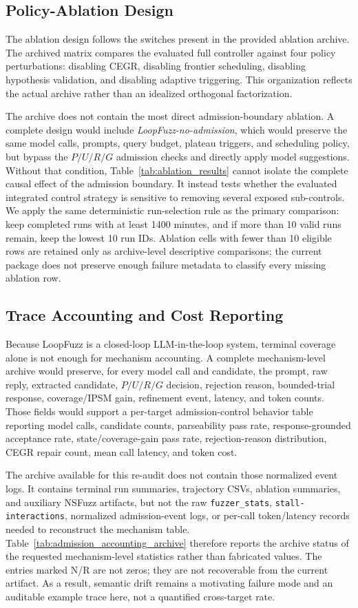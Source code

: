 \documentclass[final,5p,times,number]{elsarticle}
\begin{document}
\subsection{Policy-Ablation Design}
The ablation design follows the switches present in the provided ablation archive. The archived matrix compares the evaluated full controller against four policy perturbations: disabling CEGR, disabling frontier scheduling, disabling hypothesis validation, and disabling adaptive triggering. This organization reflects the actual archive rather than an idealized orthogonal factorization.

The archive does not contain the most direct admission-boundary ablation. A complete design would include \emph{LoopFuzz-no-admission}, which would preserve the same model calls, prompts, query budget, plateau triggers, and scheduling policy, but bypass the $P/U/R/G$ admission checks and directly apply model suggestions. Without that condition, Table~\ref{tab:ablation_results} cannot isolate the complete causal effect of the admission boundary. It instead tests whether the evaluated integrated control strategy is sensitive to removing several exposed sub-controls. We apply the same deterministic run-selection rule as the primary comparison: keep completed runs with at least 1400 minutes, and if more than 10 valid runs remain, keep the lowest 10 run IDs. Ablation cells with fewer than 10 eligible rows are retained only as archive-level descriptive comparisons; the current package does not preserve enough failure metadata to classify every missing ablation row.

\subsection{Trace Accounting and Cost Reporting}
Because LoopFuzz is a closed-loop LLM-in-the-loop system, terminal coverage alone is not enough for mechanism accounting. A complete mechanism-level archive would preserve, for every model call and candidate, the prompt, raw reply, extracted candidate, $P/U/R/G$ decision, rejection reason, bounded-trial response, coverage/IPSM gain, refinement event, latency, and token counts. Those fields would support a per-target admission-control behavior table reporting model calls, candidate counts, parseability pass rate, response-grounded acceptance rate, state/coverage-gain pass rate, rejection-reason distribution, CEGR repair count, mean call latency, and token cost.

The archive available for this re-audit does not contain those normalized event logs. It contains terminal run summaries, trajectory CSVs, ablation summaries, and auxiliary NSFuzz artifacts, but not the raw \texttt{fuzzer\_stats}, \texttt{stall-interactions}, normalized admission-event logs, or per-call token/latency records needed to reconstruct the mechanism table. Table~\ref{tab:admission_accounting_archive} therefore reports the archive status of the requested mechanism-level statistics rather than fabricated values. The entries marked N/R are not zeros; they are not recoverable from the current artifact. As a result, semantic drift remains a motivating failure mode and an auditable example trace here, not a quantified cross-target rate.
\end{document}
